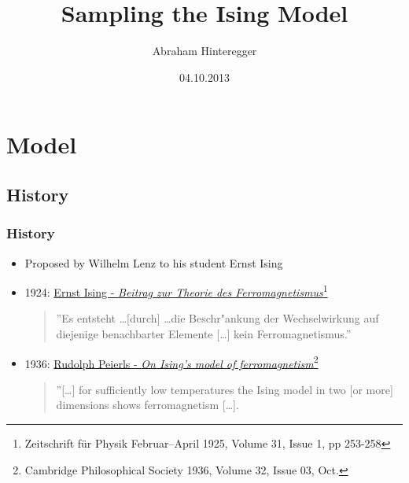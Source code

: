 \documentclass{beamer}
\begin{document}
\title{Sampling the Ising Model}
\author{Abraham Hinteregger}
\date{04.10.2013}
\titlepage
\setcounter{tocdepth}{4}
\section{Model} 
\subsection{History}
\begin{frame}\frametitle{History} 
\begin{itemize}%
\item Proposed by Wilhelm Lenz to his student Ernst Ising
\item 1924: \href{http://link.springer.com/content/pdf/10.1007 BF02980577.pdf}{Ernst Ising - \textit{Beitrag zur Theorie des Ferromagnetismus}\footnote{Zeitschrift für Physik Februar–April 1925, Volume 31, Issue 1, pp 253-258 }}
\begin{quote}
''Es entsteht \ldots [durch] \ldots die Beschr"ankung der Wechselwirkung auf diejenige  benachbarter Elemente [\ldots] kein Ferromagnetismus.''
\end{quote}
\item 1936: \href{http://journals.cambridge.org/action/displayAbstract?fromPage=online\&aid=2027260}{Rudolph Peierls - \textit{On Ising's model of ferromagnetism}\footnote{Cambridge Philosophical Society 1936, Volume 32, Issue 03, Oct.}}
\begin{quote}
''[\ldots] for sufficiently low temperatures the Ising model in two [or more] dimensions shows ferromagnetism [\ldots].
\end{quote}
\end{itemize}
\end{frame}

\end{document}
